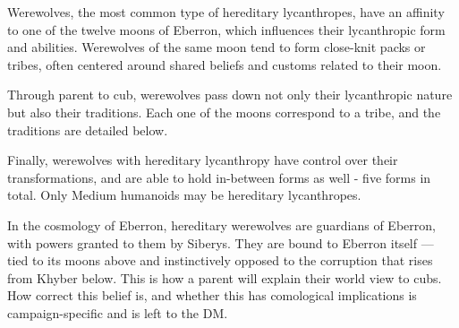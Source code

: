 \documentclass[twocolumn]{dndbook}
\begin{document}
Werewolves, the most common type of hereditary lycanthropes, have an affinity to one of the twelve moons of Eberron, which influences their lycanthropic form and abilities.
Werewolves of the same moon tend to form close-knit packs or tribes, often centered around shared beliefs and customs related to their moon.\par

Through parent to cub, werewolves pass down not only their lycanthropic nature but also their traditions.
Each one of the moons correspond to a tribe, and the traditions are detailed below.\par

Finally, werewolves with hereditary lycanthropy have control over their transformations, and are able to hold in-between forms as well - five forms in total.
Only Medium humanoids may be hereditary lycanthropes.\par

In the cosmology of Eberron, hereditary werewolves are guardians of Eberron, with powers granted to them by Siberys.
They are bound to Eberron itself --- tied to its moons above and instinctively opposed to the corruption that rises from Khyber below.
This is how a parent will explain their world view to cubs.
How correct this belief is, and whether this has comological implications is campaign-specific and is left to the DM.\par
\end{document}
